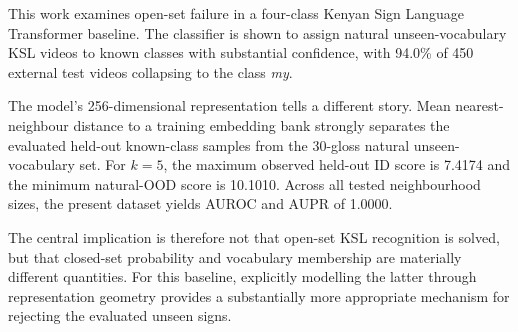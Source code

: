 \documentclass[11pt]{article}
\begin{document}
This work examines open-set failure in a four-class Kenyan
Sign Language Transformer baseline. The classifier is shown
to assign natural unseen-vocabulary KSL videos to known
classes with substantial confidence, with 94.0\% of 450
external test videos collapsing to the class \emph{my}.

The model's 256-dimensional representation tells a different
story. Mean nearest-neighbour distance to a training embedding
bank strongly separates the evaluated held-out known-class
samples from the 30-gloss natural unseen-vocabulary set.
For $k=5$, the maximum observed held-out ID score is 7.4174
and the minimum natural-OOD score is 10.1010. Across all
tested neighbourhood sizes, the present dataset yields
AUROC and AUPR of 1.0000.

The central implication is therefore not that open-set KSL
recognition is solved, but that closed-set probability and
vocabulary membership are materially different quantities.
For this baseline, explicitly modelling the latter through
representation geometry provides a substantially more
appropriate mechanism for rejecting the evaluated unseen
signs.
\end{document}
